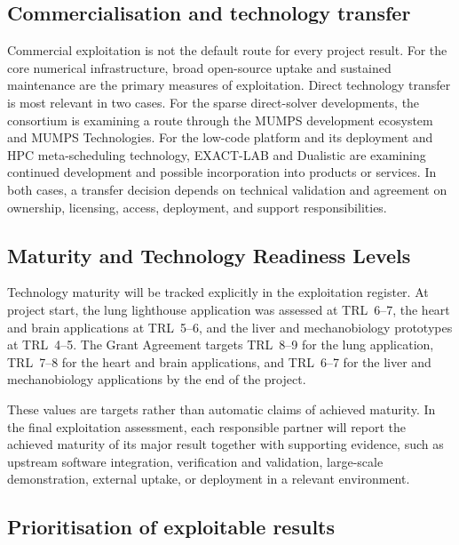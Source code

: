 \documentclass[a4paper,12pt]{article}
\begin{document}
\subsection{Commercialisation and technology transfer}

Commercial exploitation is not the default route for every project result.
For the core numerical infrastructure, broad open-source uptake and sustained
maintenance are the primary measures of exploitation. Direct technology
transfer is most relevant in two cases. For the sparse direct-solver
developments, the consortium is examining a route through the MUMPS
development ecosystem and MUMPS Technologies. For the low-code platform and
its deployment and HPC meta-scheduling technology, EXACT-LAB and Dualistic
are examining continued development and possible incorporation into products
or services. In both cases, a transfer decision depends on technical
validation and agreement on ownership, licensing, access, deployment, and
support responsibilities.

\subsection{Maturity and Technology Readiness Levels}

Technology maturity will be tracked explicitly in the exploitation register.
At project start, the lung lighthouse application was assessed at TRL~6--7,
the heart and brain applications at TRL~5--6, and the liver and
mechanobiology prototypes at TRL~4--5. The Grant Agreement targets TRL~8--9
for the lung application, TRL~7--8 for the heart and brain applications, and
TRL~6--7 for the liver and mechanobiology applications by the end of the
project.

These values are targets rather than automatic claims of achieved maturity.
In the final exploitation assessment, each responsible partner will report
the achieved maturity of its major result together with supporting evidence,
such as upstream software integration, verification and validation,
large-scale demonstration, external uptake, or deployment in a relevant
environment.

\subsection{Prioritisation of exploitable results}
\end{document}

